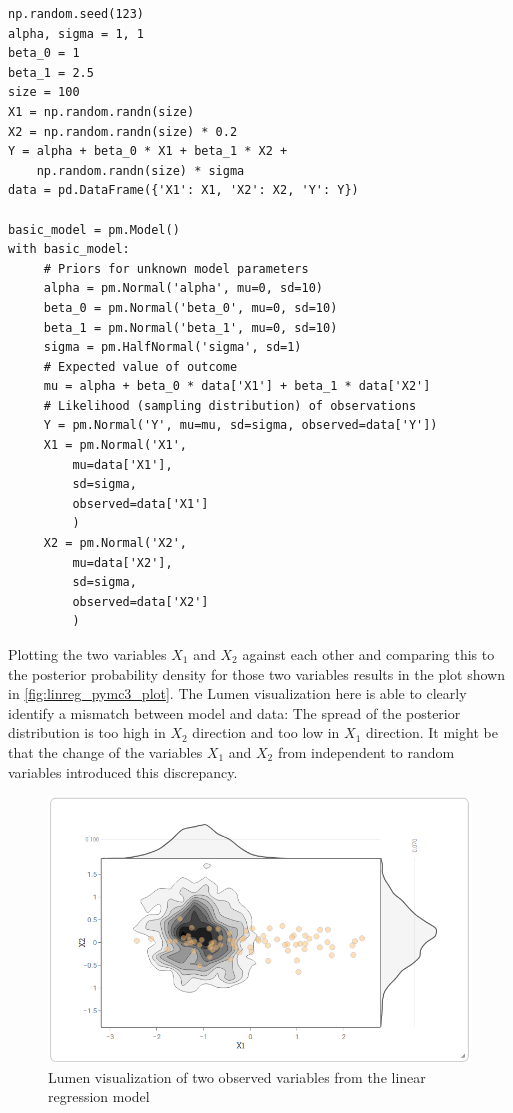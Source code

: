 \documentclass{article}
\begin{document}
\begin{minipage}{\linewidth}
\begin{lstlisting}[caption={PyMC3 model of linear regression example}, label={list:code_use_case_2},captionpos=b]
np.random.seed(123)
alpha, sigma = 1, 1
beta_0 = 1
beta_1 = 2.5
size = 100
X1 = np.random.randn(size)
X2 = np.random.randn(size) * 0.2
Y = alpha + beta_0 * X1 + beta_1 * X2 + 
    np.random.randn(size) * sigma
data = pd.DataFrame({'X1': X1, 'X2': X2, 'Y': Y})
	
basic_model = pm.Model()
with basic_model:
     # Priors for unknown model parameters
     alpha = pm.Normal('alpha', mu=0, sd=10)
     beta_0 = pm.Normal('beta_0', mu=0, sd=10)
     beta_1 = pm.Normal('beta_1', mu=0, sd=10)
     sigma = pm.HalfNormal('sigma', sd=1)
     # Expected value of outcome 
     mu = alpha + beta_0 * data['X1'] + beta_1 * data['X2']
     # Likelihood (sampling distribution) of observations
     Y = pm.Normal('Y', mu=mu, sd=sigma, observed=data['Y'])
     X1 = pm.Normal('X1', 
         mu=data['X1'], 
         sd=sigma, 
         observed=data['X1']
         )
     X2 = pm.Normal('X2', 
         mu=data['X2'], 
         sd=sigma, 
         observed=data['X2']
         )
\end{lstlisting}
\end{minipage}
Plotting the two variables $X_1$ and $X_2$ against each other and comparing this to the posterior probability density for those two variables results in the plot shown in \autoref{fig:linreg_pymc3_plot}. The Lumen visualization here is able to clearly identify a mismatch between model and data: The spread of the posterior distribution is too high in $X_2$ direction and too low in $X_1$ direction. It might be that the change of the variables $X_1$ and $X_2$ from independent to random variables introduced this discrepancy.
\begin{figure}
	\includegraphics[width=\textwidth]{images/linreg_pymc3_plot.png}
	\caption[Lumen visualization of two observed variables from the linear regression model]{Lumen visualization of two observed variables from the linear regression model}
	\label{fig:linreg_pymc3_plot}
\end{figure}
\end{document}
